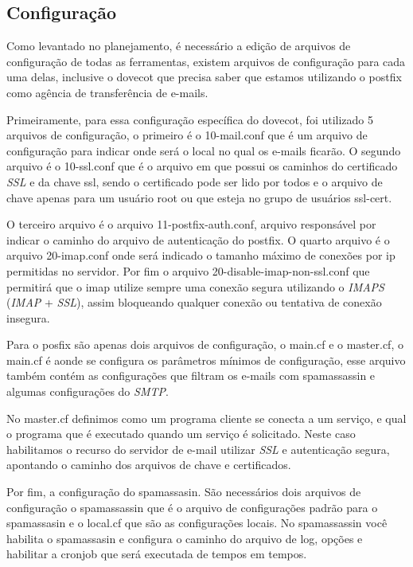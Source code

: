 \subsection{Configuração}

Como levantado no planejamento, é necessário a edição de arquivos de configuração
de todas as ferramentas, existem arquivos de configuração para cada uma delas, inclusive
o dovecot que precisa saber que estamos utilizando o postfix como agência de transferência
de e-mails.

Primeiramente, para essa configuração específica do dovecot, foi utilizado 5 arquivos
de configuração, o primeiro é o 10-mail.conf que é um arquivo de configuração para
indicar onde será o local no qual os e-mails ficarão. O segundo arquivo é o 10-ssl.conf
que é o arquivo em que possui os caminhos do certificado \textit{SSL} e da chave ssl, sendo o
certificado pode ser lido por todos e o arquivo de chave apenas para um usuário root
ou que esteja no grupo de usuários ssl-cert. 

O terceiro arquivo é o arquivo
11-postfix-auth.conf, arquivo responsável por indicar o caminho do arquivo de autenticação
do postfix. O quarto arquivo é o arquivo 20-imap.conf onde será indicado o tamanho
máximo de conexões por ip permitidas no servidor. Por fim o arquivo
20-disable-imap-non-ssl.conf que permitirá que o imap utilize sempre uma conexão
segura utilizando o \textit{IMAPS} (\textit{IMAP} + \textit{SSL}), assim bloqueando 
qualquer conexão ou tentativa de conexão insegura.

Para o posfix são apenas dois arquivos de configuração, o main.cf e o master.cf,
o main.cf é aonde se configura os parâmetros mínimos de configuração, esse arquivo
também contém as configurações que filtram os e-mails com spamassassin e 
algumas configurações do \textit{SMTP}. 

No master.cf definimos como um programa cliente se conecta a um serviço, e qual o
programa que é executado quando um serviço é solicitado. Neste caso habilitamos
o recurso do servidor de e-mail utilizar \textit{SSL} e autenticação segura, 
apontando o caminho dos arquivos de chave e certificados.

Por fim, a configuração do spamassasin. São necessários dois arquivos de configuração
o spamassassin que é o arquivo de configurações padrão para o spamassasin e o
local.cf que são as configurações locais. No spamassassin você habilita o spamassasin
e configura o caminho do arquivo de log, opções e habilitar a cronjob que será
executada de tempos em tempos. 


